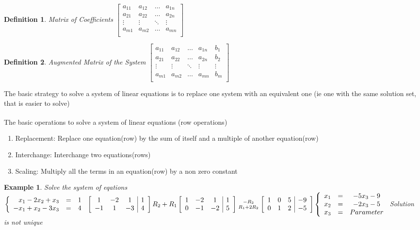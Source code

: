 \documentclass[a4paper,12pt,openany]{book}
\newcommand*{\bfrac}[2]{\genfrac{}{}{0pt}{}{#1}{#2}}
\theoremstyle{defn}
\newtheorem{defn}{Definition}[section]
\theoremstyle{expl}
\newtheorem{expl}{Example}[section]
\begin{document}
\begin{defn}\textup{Matrix of Coefficients} 
$\left[ \begin{array}{cccc}
a_{11} & a_{12} & \ldots & a_{1n}\\
a_{21} & a_{22} & \ldots & a_{2n}\\
\vdots &\vdots&\ddots& \vdots\\
a_{m1} & a_{m2} & \ldots & a_{mn}\\
\end{array} \right]$ \end{defn}
\begin{defn}\textup{Augmented Matrix of the System}
$\left[ \begin{array}{cccc|c}
a_{11} & a_{12} & \ldots & a_{1n} & b_1\\
a_{21} & a_{22} & \ldots & a_{2n} & b_2\\
\vdots &\vdots&\ddots& \vdots &\vdots\\
a_{m1} & a_{m2} & \ldots & a_{mn} & b_m\\
\end{array}\right]$ \end{defn}
The basic strategy to solve a system of linear equations is to replace one system with an equivalent one (ie one with the same solution set, that is easier to solve)\\\-\\
The basic operations to solve a system of linear equations (row operations)
\begin{enumerate}
\item Replacement: Replace one equation(row) by the sum of itself and a multiple of another equation(row)
\item Interchange: Interchange two equations(rows)
\item Scaling: Multiply all the terms in an equation(row) by a non zero constant
\end{enumerate}
\begin{expl}
	\textup{Solve the system of eqations} $\left\{\begin{array}{rcc}x_1-2x_2+x_3&=&1\\-x_1+x_2-3x_3&=&4\end{array}\right.\\
\left[\begin{array}{ccc|c}1&-2&1&1\\-1&1&-3&4\end{array}\right] R_2+R_1 \left[\begin{array}{ccc|c}1&-2&1&1\\0&-1&-2&5\end{array}\right] \bfrac{-R_2}{R_1+2R_2} \left[\begin{array}{ccc|c}1&0&5&-9\\0&1&2&-5\end{array}\right]
\left\{\begin{array}{rcc}x_1&=&-5x_3-9\\x_2&=&-2x_3-5\\x_3&=&Parameter\end{array}\right.\\
$\textup{Solution is not unique}\end{expl}
\end{document}
